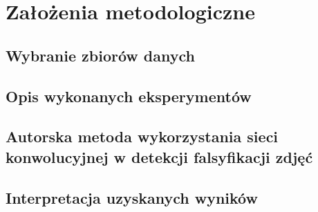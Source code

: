 \chapter{Założenia metodologiczne}

\section{Wybranie zbiorów danych}

\section{Opis wykonanych eksperymentów}

\section{ Autorska metoda wykorzystania sieci konwolucyjnej w detekcji falsyfikacji zdjęć}

\section{Interpretacja uzyskanych wyników}